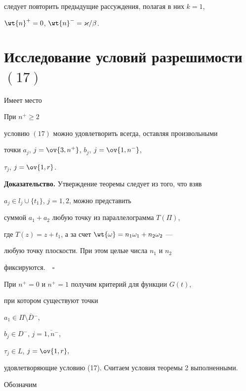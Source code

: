 следует повторить предыдущие рассуждения, полагая в них $k=1$,


$\wt{n}^{+} = 0$, $\wt{n}^{-} = \varkappa/\beta$.





\section{Исследование условий разрешимости $(17)$}





Имеет место





\begin{thm}


При $n^{+}\ge 2$


условию $(17)$ можно удовлетворить всегда, оставляя произвольными


точки $a_{j}$, $j=\ov{3,n^{+}}$, $b_{j}$, $j=\ov{1,n^{-}}$,


$\tau_{j}$, $j=\ov{1,r}$.


\end{thm}





{\bf Доказательство.} Утверждение теоремы следует из того, что взяв


$a_j\in l_j\cup\{t_1\}$, $j=1,2$, можно представить


суммой $a_1 +a_2 $ любую точку из параллелограмма $T(\Pi)$,


где $T(z)=z+t_1$, а за счет $\wt{\omega} = n_1 \omega_1 +n_2 \omega_2$ ---


любую точку плоскости. При этом целые числа $n_1$ и $n_2$


фиксируются.$\quad\square$





При $n^+ =0 $ и $n^+ =1$ получим критерий для функции $G(t)$,


при котором существуют точки


$a_1\in\Pi\setminus \overline {D}{}^{-}$,


$b_j\in D^-$, $j= \overline{1,n^-}$,


$\tau_{j}\in L$, $j=\ov{1,r}, $


удовлетворяющие условию (17). Считаем условия теоремы 2 выполненными.


Обозначим 



